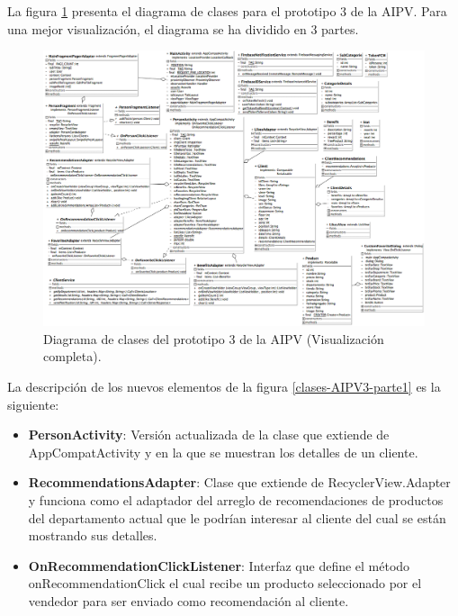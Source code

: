 La figura \ref{clases-AIPV3} presenta el diagrama de clases para el prototipo 3 de la AIPV. Para una mejor visualización, el diagrama se ha dividido en 3 partes. 

\FloatBarrier
\begin{figure}[htbp!]
		\centering
			\includegraphics[width=1 \textwidth]{imagenes/adrian/vendedor/prototipo3/clases}
		\caption{Diagrama de clases del prototipo 3 de la AIPV (Visualización completa).}
		\label{clases-AIPV3}
\end{figure}
\FloatBarrier

La descripción de los nuevos elementos de la figura \ref{clases-AIPV3-parte1} es la siguiente: 

\begin{itemize}
\item \textbf{PersonActivity}: Versión actualizada de la clase que extiende de AppCompatActivity y en la que se muestran los detalles de un cliente.
\item \textbf{RecommendationsAdapter}: Clase que extiende de RecyclerView.Adapter y funciona como el adaptador del arreglo de recomendaciones de productos del departamento actual que le podrían interesar al cliente del cual se están mostrando sus detalles. 
\item \textbf{OnRecommendationClickListener}: Interfaz que define el método onRecommendationClick el cual recibe un producto seleccionado por el vendedor para ser enviado como recomendación al cliente.
\end{itemize}


